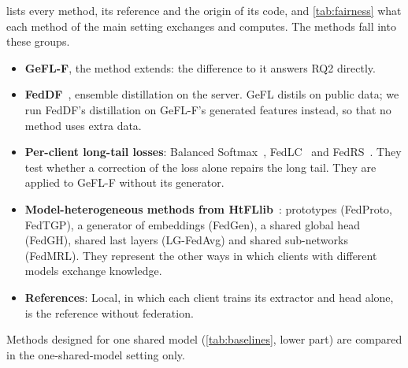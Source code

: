  lists every method, its reference and the origin of its code, and \cref{tab:fairness} what each
method of the main setting exchanges and computes. The methods fall into these groups.
\begin{itemize}
\item \textbf{GeFL-F}, the method \ours extends: the difference to it answers RQ2 directly.
\item \textbf{FedDF}~\cite{lin2020feddf}, ensemble distillation on the server. GeFL distils on public data; we
run FedDF's distillation on GeFL-F's generated features instead, so that no method uses extra data.
\item \textbf{Per-client long-tail losses}: Balanced Softmax~\cite{ren2020bsm}, FedLC~\cite{zhang2022fedlc} and
FedRS~\cite{li2021fedrs}. They test whether a correction of the loss alone repairs the long tail. They are applied
to GeFL-F without its generator.
\item \textbf{Model-heterogeneous methods from HtFLlib}~\cite{zhang2025htfllib}: prototypes (FedProto, FedTGP), a
generator of embeddings (FedGen), a shared global head (FedGH), shared last layers (LG-FedAvg) and shared
sub-networks (FedMRL). They represent the other ways in which clients with different models exchange knowledge.
\item \textbf{References}: Local, in which each client trains its extractor and head alone, is the reference without
federation.
\end{itemize}
Methods designed for one shared model (\cref{tab:baselines}, lower part) are compared in the one-shared-model setting
only.

